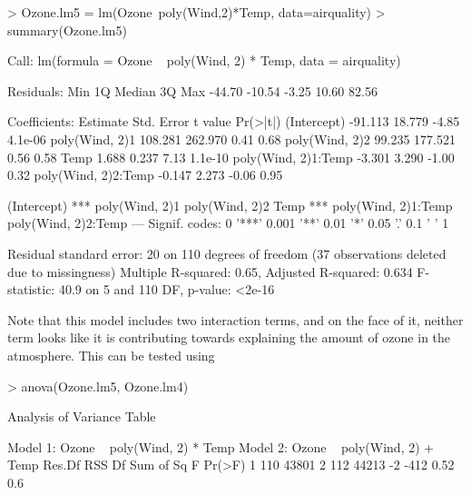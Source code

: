\begin{Schunk}
\begin{Sinput}
> Ozone.lm5 = lm(Ozone~poly(Wind,2)*Temp, data=airquality) 
> summary(Ozone.lm5) 
\end{Sinput}
\begin{Soutput}

Call:
lm(formula = Ozone ~ poly(Wind, 2) * Temp, data = airquality)

Residuals:
   Min     1Q Median     3Q    Max 
-44.70 -10.54  -3.25  10.60  82.56 

Coefficients:
                    Estimate Std. Error t value Pr(>|t|)
(Intercept)          -91.113     18.779   -4.85  4.1e-06
poly(Wind, 2)1       108.281    262.970    0.41     0.68
poly(Wind, 2)2        99.235    177.521    0.56     0.58
Temp                   1.688      0.237    7.13  1.1e-10
poly(Wind, 2)1:Temp   -3.301      3.290   -1.00     0.32
poly(Wind, 2)2:Temp   -0.147      2.273   -0.06     0.95
                       
(Intercept)         ***
poly(Wind, 2)1         
poly(Wind, 2)2         
Temp                ***
poly(Wind, 2)1:Temp    
poly(Wind, 2)2:Temp    
---
Signif. codes:  
0 '***' 0.001 '**' 0.01 '*' 0.05 '.' 0.1 ' ' 1

Residual standard error: 20 on 110 degrees of freedom
  (37 observations deleted due to missingness)
Multiple R-squared:  0.65,	Adjusted R-squared:  0.634 
F-statistic: 40.9 on 5 and 110 DF,  p-value: <2e-16
\end{Soutput}
\end{Schunk}

Note that this model includes two interaction terms, and on the face of it, neither term looks like it is contributing towards explaining the amount of ozone in the atmosphere. This can be tested using 

\begin{Schunk}
\begin{Sinput}
> anova(Ozone.lm5, Ozone.lm4) 
\end{Sinput}
\begin{Soutput}
Analysis of Variance Table

Model 1: Ozone ~ poly(Wind, 2) * Temp
Model 2: Ozone ~ poly(Wind, 2) + Temp
  Res.Df   RSS Df Sum of Sq    F Pr(>F)
1    110 43801                         
2    112 44213 -2      -412 0.52    0.6
\end{Soutput}
\end{Schunk}

